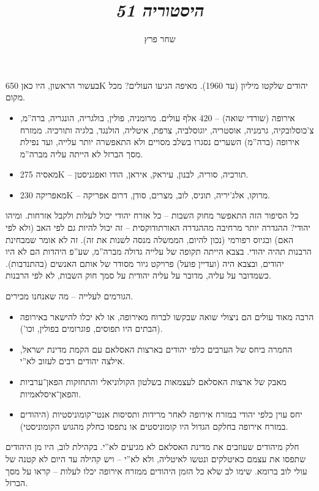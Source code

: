 \documentclass[]{../../../../tex/classes/styledArticle}
\author{שחר פרץ}
\title{\textit{היסטוריה 51}}
\begin{document}
	\maketitle
	בעשור הראשון, היו כאן 650K יהודים שלקטו מיליון (עד 1960). מאיפה הגיעו העולים? מכל מקום. 
	\begin{itemize}
		\item אירופה (שורדי שואה) – 420 אלף עולים. מרומניה, פולין, בולגריה, הונגריה, ברה''מ, צ'כוסלובקיה, גרמניה, אוסטריה, יוגוסלביה, צרפת, איטליה, הולנגד, בלגיה ותורכיה. ממזרח אירופה (ברה''מ) השערים נסגרו בשלב מסויים ולא התאפשרה יותר עלייה, ועד נפילת מסך הברזל לא הייתה עליה מברה''מ. 
		\item מאסיה 275K – תורכיה, סוריה, לבנון, עיראק, איראן, הודו ואפגניסטן. 
		\item מאפריקה 230K – מרוקו, אלג'יריה, תוניס, לוב, מצרים, סודן, דרום אפריקה. 
	\end{itemize}
	
	כל הסיפור הזה התאפשר מחוק השבות – כל אזרח יהודי יכול לעלות ולקבל אזרחות. ומיהו יהודי? ההגדרה יותר מרחיבה מההגדרה האורתודוקסית – זה יכול להיות גם לפי האב (ולא לפי האם) ובגיוס רפורמי (נכון להיום, הממשלה מנסה לשנות את זה). זה לא אומר שמבחינת הרבנות תהיה יהודי. בצבא הייתה תקופה של עלייה גדולה מברה''מ, שע''פ היהדות הם לא היו יהודים, ובצבא היה (ועדיין פועל) פרויקט גיור מסודר של אותם האנשים (בהתנדבות). כשמדובר על עליה, מדובר על עליה יהודית על סמך חוק השבות, לא לפי הרבנות. 
	
	הגורמים לעלייה – מה שאנחנו מכירים. 
	\begin{itemize}
		\item הרבה מאוד עולים הם ניצולי שואה שבקשו לברוח מאירופה, או לא יכלו להישאר באירופה (הבתים היו תפוסים, פוגרומים בפולין, וכו'). 
		\item החמרה ביחס של הערבים כלפי יהודים בארצות האסלאם עם הקמת מדינת ישראל, אילצה יהודים רבים לעזוב לא''י. 
		\item מאבק של ארצות האסלאם לעצמאות בשלטון הקולוניאלי והתחזקות הפאן־ערביות והפאן־איסלאמיות. 
		\item יחס עוין כלפי יהודי במזרח אירופה לאחר מרידות ותסיסות אנטי־קומוניסטיות (היהודים במזרח אירופה בחלקם הגדול היו קומוניסטים או נתפסו כחלק מהגוש הקומוניסטי). 
	\end{itemize}
	חלק מיהודים שעוזבים את מדינת האסלאם לא מגיעים לא''י. בקהילת לוב, היו מן היהודים שתפסו את עצמם כאיטלקים ונטשו לאיטליה, ולא לא''י – ויש קהילה עד היום לא קטנה של עולי לוב ברומא. שימו לב שלא כל הזמן היהודים ממזרח אירופה יכלו לעלות – קראו על מסך הברזל. 
	
\end{document}
